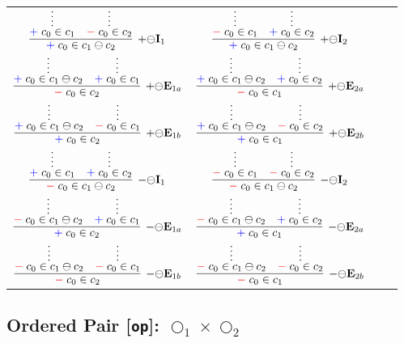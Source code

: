\documentclass[11pt]{article}
\begin{document}
\noindent
\begin{tabular}{cccc}
$
\infer[\AssertRule{\ominus}\Intro{1}]{\Assert{c_0\in c_1 \ominus c_2}}{
	\infer*{\Assert{c_0\in c_1}}{}
	&
	\infer*{\Deny{c_0\in c_2}}{}
}
$
\hspace{.2cm}
&
$
\infer[\AssertRule{\ominus}\Intro{2}]{\Assert{c_0\in c_1 \ominus c_2}}{
	\infer*{\Deny{c_0\in c_1}}{}
	&
	\infer*{\Assert{c_0\in c_2}}{}
}
$
\\[2mm]
$
\infer[\AssertRule{\ominus}\Elim{1a}]{\Deny{c_0\in c_2}}{
	\infer*{\Assert{c_0\in c_1 \ominus c_2}}{}
	&
	\infer*{\Assert{c_0\in c_1}}{}
}
$
\hspace{.2cm}
&
$
\infer[\AssertRule{\ominus}\Elim{2a}]{\Deny{c_0\in c_1}}{
	\infer*{\Assert{c_0\in c_1 \ominus c_2}}{}
	&
	\infer*{\Assert{c_0\in c_2}}{}
}
$
\\[2mm]
$
\infer[\AssertRule{\ominus}\Elim{1b}]{\Assert{c_0\in c_2}}{
	\infer*{\Assert{c_0\in c_1 \ominus c_2}}{}
	&
	\infer*{\Deny{c_0\in c_1}}{}
}
$
\hspace{.2cm}
&
$
\infer[\AssertRule{\ominus}\Elim{2b}]{\Assert{c_0\in c_1}}{
	\infer*{\Assert{c_0\in c_1 \ominus c_2}}{}
	&
	\infer*{\Deny{c_0\in c_2}}{}
}
$
\\[2mm]
$
\infer[\DenyRule{\ominus}\Intro{1}]{\Deny{c_0\in c_1 \ominus c_2}}{
	\infer*{\Assert{c_0\in c_1}}{}
	&
	\infer*{\Assert{c_0\in c_2}}{}
}
$
\hspace{.2cm}
&
$
\infer[\DenyRule{\ominus}\Intro{2}]{\Deny{c_0\in c_1 \ominus c_2}}{
	\infer*{\Deny{c_0\in c_1}}{}
	&
	\infer*{\Deny{c_0\in c_2}}{}
}
$
\\[2mm]
$
\infer[\DenyRule{\ominus}\Elim{1a}]{\Assert{c_0\in c_2}}{
	\infer*{\Deny{c_0\in c_1 \ominus c_2}}{}
	&
	\infer*{\Assert{c_0\in c_1}}{}
}
$
\hspace{.2cm}
&
$
\infer[\DenyRule{\ominus}\Elim{2a}]{\Assert{c_0\in c_1}}{
	\infer*{\Deny{c_0\in c_1 \ominus c_2}}{}
	&
	\infer*{\Assert{c_0\in c_2}}{}
}
$
\\[2mm]
$
\infer[\DenyRule{\ominus}\Elim{1b}]{\Deny{c_0\in c_2}}{
	\infer*{\Deny{c_0\in c_1 \ominus c_2}}{}
	&
	\infer*{\Deny{c_0\in c_1}}{}
}
$
\hspace{.2cm}
&
$
\infer[\DenyRule{\ominus}\Elim{2b}]{\Deny{c_0\in c_1}}{
	\infer*{\Deny{c_0\in c_1 \ominus c_2}}{}
	&
	\infer*{\Deny{c_0\in c_2}}{}
}
$
\end{tabular}
\bigskip



\subsection*{Ordered Pair [\texttt{op}]: $\bigcirc_1\times\bigcirc_2$}
\end{document}
